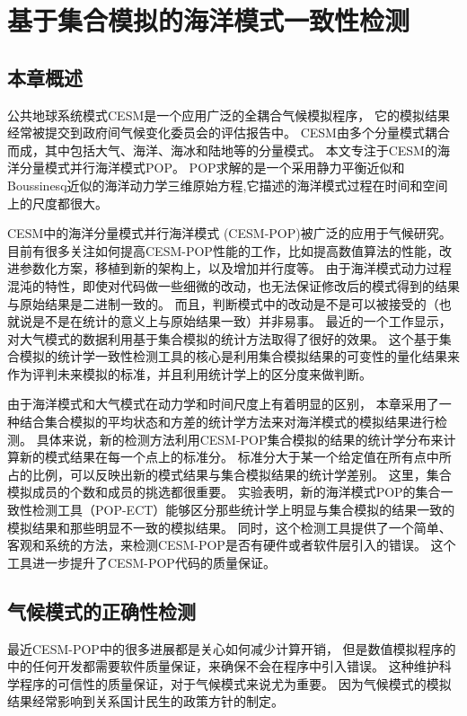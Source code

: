 \chapter{基于集合模拟的海洋模式一致性检测}
\label{cha:verify}

\section{本章概述}
\label{verify:intro}

公共地球系统模式CESM是一个应用广泛的全耦合气候模拟程序\cite{hurrell2013community}， 它的模拟结果经常被提交到政府间气候变化委员会的评估报告中\cite{stocker2013ipcc}。
CESM由多个分量模式耦合而成，其中包括大气、海洋、海冰和陆地等的分量模式。 
本文专注于CESM的海洋分量模式并行海洋模式POP。  
POP求解的是一个采用静力平衡近似和Boussinesq近似的海洋动力学三维原始方程,它描述的海洋模式过程在时间和空间上的尺度都很大。  

CESM中的海洋分量模式并行海洋模式 (CESM-POP)被广泛的应用于气候研究。 
目前有很多关注如何提高CESM-POP性能的工作，比如提高数值算法的性能，改进参数化方案，移植到新的架构上，以及增加并行度等。 
由于海洋模式动力过程混沌的特性，即使对代码做一些细微的改动，也无法保证修改后的模式得到的结果与原始结果是二进制一致的。 
而且，判断模式中的改动是不是可以被接受的（也就说是不是在统计的意义上与原始结果一致）并非易事。 
最近的一个工作显示，对大气模式的数据利用基于集合模拟的统计方法取得了很好的效果。
这个基于集合模拟的统计学一致性检测工具的核心是利用集合模拟结果的可变性的量化结果来作为评判未来模拟的标准，并且利用统计学上的区分度来做判断。 

由于海洋模式和大气模式在动力学和时间尺度上有着明显的区别，
本章采用了一种结合集合模拟的平均状态和方差的统计学方法来对海洋模式的模拟结果进行检测。 
具体来说，新的检测方法利用CESM-POP集合模拟的结果的统计学分布来计算新的模式结果在每一个点上的标准分。 
标准分大于某一个给定值在所有点中所占的比例，可以反映出新的模式结果与集合模拟结果的统计学差别。 
这里，集合模拟成员的个数和成员的挑选都很重要。
实验表明，新的海洋模式POP的集合一致性检测工具（POP-ECT）能够区分那些统计学上明显与集合模拟的结果一致的模拟结果和那些明显不一致的模拟结果。 
同时，这个检测工具提供了一个简单、客观和系统的方法，来检测CESM-POP是否有硬件或者软件层引入的错误。
这个工具进一步提升了CESM-POP代码的质量保证。 

\section{气候模式的正确性检测}
\label{verify:Backgroud}

最近CESM-POP中的很多进展都是关心如何减少计算开销\cite{yong2015}， 但是数值模拟程序的中的任何开发都需要软件质量保证，来确保不会在程序中引入错误。 
这种维护科学程序的可信性的质量保证，对于气候模式来说尤为重要。 
因为气候模式的模拟结果经常影响到关系国计民生的政策方针的制定\cite{carson2002, easterbrook2011}。 

